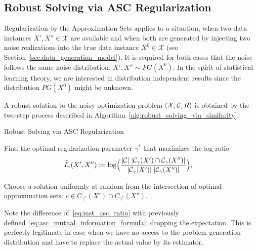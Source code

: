 
\subsection{Robust Solving via ASC Regularization}
\label{subsec:asc_regularization_crit}
Regularization by the Approximation Sets applies to a situation, when two data
instances $X', X'' \in \mathcal{X}$ are available and when both are generated by
injecting two noise realizations into the true data instance $X^0 \in
\mathcal{X}$ (see Section~\ref{sec:data_generation_model}). It is required for
both cases that the noise follows the same noise distribution: $X', X'' \sim
PG(X^0)$. In the spirit of statistical learning theory, we are interested in
distribution independent results since the distribution $PG(X^0)$ might be
unknown.

A robust solution to the noisy optimization problem $(\mathcal{X}, {\cal C}, R)$ is
obtained by the two-step process described in
Algorithm~\ref{alg:robust_solving_via_similarity}.

\begin{algorithm}[hb!]
\caption{Robust Solving via ASC Regularization}
\label{alg:robust_solving_via_similarity}


  {
    Find the optimal regularization parameter $\gamma^*$ that
    maximizes the log-ratio 
    \begin{equation}\label{eq:mst_asc_ratio}
      \hat I_\gamma(X', X'') \coloneqq \log 
      \Bigl(
        \frac{|\C| \; |{\C}_{\gamma}(X') \cap {\C}_{\gamma}(X'')|}%
          {|\mathcal{C}_\gamma(X')| \; |\mathcal{C}_\gamma(X'')|}
      \Bigr),
    \end{equation}
  }

  {Choose a solution uniformly at random from the intersection of
        optimal approximation sets: $c \in C_{\gamma^*}(X') \cap
        C_{\gamma^*}(X'')$.}
\end{algorithm}

\myremark Note the difference of~\eqref{eq:mst_asc_ratio} with previously
defined~\eqref{eq:asc_mutual_information_formula}: dropping the 
expectation. This is perfectly legitimate in case when we have no access to the
problem generation distribution and have to replace the actual value by its
estimator.

